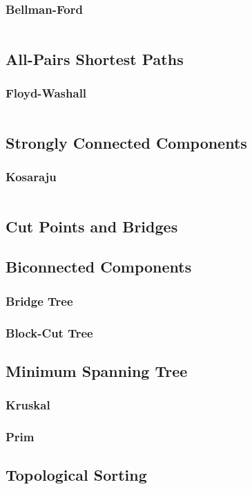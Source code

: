 \documentclass[8pt,a4paper,landscape,oneside]{amsart}
\newcommand{\code}[1]{\inputminted[fontsize=\normalsize,baselinestretch=1]{cpp}{_code/#1}}
\begin{document}
\begin{multicols*}{3}
		\subsubsection{Bellman-Ford}
			\code{graphs/bellman_ford.cpp}
	\subsection{All-Pairs Shortest Paths}
		\subsubsection{Floyd-Washall}
			\code{graphs/floyd_warshall.cpp}
	\subsection{Strongly Connected Components}
		\subsubsection{Kosaraju}
      \code{graphs/Kosaraju.cpp}
	\subsection{Cut Points and Bridges}
	\subsection{Biconnected Components}
		\subsubsection{Bridge Tree}
		\subsubsection{Block-Cut Tree}
	\subsection{Minimum Spanning Tree}
		\subsubsection{Kruskal}
		\subsubsection{Prim}
	\subsection{Topological Sorting}

\end{multicols*}
\end{document}
